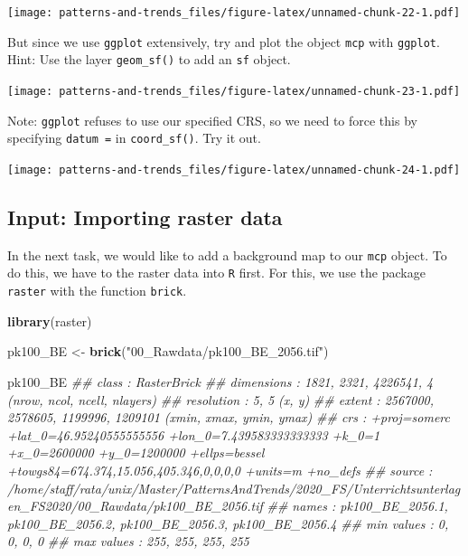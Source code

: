 \documentclass[]{book}
\newenvironment{Shaded}{\begin{snugshade}}{\end{snugshade}}
\newcommand{\CommentTok}[1]{\textcolor[rgb]{0.56,0.35,0.01}{\textit{#1}}}
\newcommand{\KeywordTok}[1]{\textcolor[rgb]{0.13,0.29,0.53}{\textbf{#1}}}
\newcommand{\NormalTok}[1]{#1}
\newcommand{\StringTok}[1]{\textcolor[rgb]{0.31,0.60,0.02}{#1}}
\begin{document}
\texttt{[image: patterns-and-trends\_files/figure-latex/unnamed-chunk-22-1.pdf]}

But since we use \texttt{ggplot} extensively, try and plot the object \texttt{mcp} with \texttt{ggplot}. Hint: Use the layer \texttt{geom\_sf()} to add an \texttt{sf} object.

\texttt{[image: patterns-and-trends\_files/figure-latex/unnamed-chunk-23-1.pdf]}

Note: \texttt{ggplot} refuses to use our specified CRS, so we need to force this by specifying \texttt{datum\ =} in \texttt{coord\_sf()}. Try it out.

\texttt{[image: patterns-and-trends\_files/figure-latex/unnamed-chunk-24-1.pdf]}

\hypertarget{input-importing-raster-data}{%
\subsection{Input: Importing raster data}\label{input-importing-raster-data}}

In the next task, we would like to add a background map to our \texttt{mcp} object. To do this, we have to the raster data into \texttt{R} first. For this, we use the package \texttt{raster} with the function \texttt{brick}.

\begin{Shaded}
\begin{Highlighting}[]

\KeywordTok{library}\NormalTok{(raster)}

\NormalTok{pk100_BE <-}\StringTok{ }\KeywordTok{brick}\NormalTok{(}\StringTok{"00_Rawdata/pk100_BE_2056.tif"}\NormalTok{)}

\NormalTok{pk100_BE}
\CommentTok{## class      : RasterBrick }
\CommentTok{## dimensions : 1821, 2321, 4226541, 4  (nrow, ncol, ncell, nlayers)}
\CommentTok{## resolution : 5, 5  (x, y)}
\CommentTok{## extent     : 2567000, 2578605, 1199996, 1209101  (xmin, xmax, ymin, ymax)}
\CommentTok{## crs        : +proj=somerc +lat_0=46.95240555555556 +lon_0=7.439583333333333 +k_0=1 +x_0=2600000 +y_0=1200000 +ellps=bessel +towgs84=674.374,15.056,405.346,0,0,0,0 +units=m +no_defs }
\CommentTok{## source     : /home/staff/rata/unix/Master/PatternsAndTrends/2020_FS/Unterrichtsunterlagen_FS2020/00_Rawdata/pk100_BE_2056.tif }
\CommentTok{## names      : pk100_BE_2056.1, pk100_BE_2056.2, pk100_BE_2056.3, pk100_BE_2056.4 }
\CommentTok{## min values :               0,               0,               0,               0 }
\CommentTok{## max values :             255,             255,             255,             255}
\end{Highlighting}
\end{Shaded}
\end{document}
